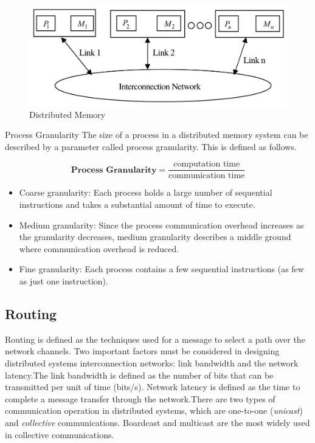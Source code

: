 \documentclass[11pt]{article}
\begin{document}
\begin{figure}[htp]
\centering
\includegraphics[scale=0.25]{distributed.png}
\caption{Distributed Memory}
\end{figure}

Process Granularity The size of a process in a distributed memory system can be described by a parameter called process granularity. This is defined as follows.

\begin{equation}
 \textbf{Process Granularity}= \frac{\text{computation time}}  {\text{communication time}}
\end{equation}

 
\begin{itemize}
  \item Coarse granularity: Each process holds a large number of sequential instructions and takes a substantial amount of time to execute.
  \item Medium granularity: Since the process communication overhead increases as the granularity decreases, medium granularity describes a middle ground
where communication overhead is reduced.
  \item Fine granularity: Each process contains a few sequential instructions (as few
as just one instruction).
\end{itemize}



\subsection{Routing}
Routing is defined as the techniques used for a message to select a path over the network channels.
Two important factors must be considered in designing distributed systems interconnection networks: link bandwidth and the network latency.The link bandwidth is defined as the number of bits that can be transmitted per unit of time (bits/s). Network latency is defined as the time to complete a message transfer through the network.There are two types of communication operation in distributed systems, which are one-to-one (\textit{unicast}) and \textit{collective} communications. Boardcast and multicast are the most widely used in collective communications.
\end{document}

